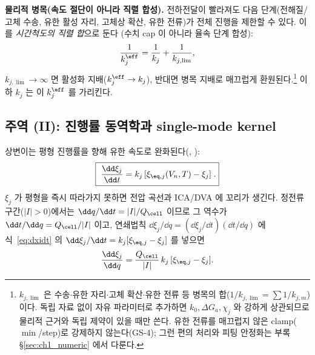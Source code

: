 \textbf{물리적 병목(속도 절단이 아니라 직렬 합성).} 전하전달이 빨라져도 다음 단계(전해질/고체 수송, 유한
활성 자리, 고체상 확산, 유한 전류)가 전체 진행을 제한할 수 있다. 이를 \emph{시간척도의 직렬 합}으로 둔다
(수치 cap 이 아니라 율속 단계 합성):
\begin{equation}
\frac{1}{k_j^{\eff}}=\frac{1}{k_j}+\frac{1}{k_{j,\lim}},
\label{eq:kphys}
\end{equation}
$k_{j,\lim}\to\infty$ 면 활성화 지배($k_j^{\eff}\to k_j$), 반대면 병목 지배로 매끄럽게 환원된다.\footnote{%
$k_{j,\lim}$ 은 수송$\cdot$유한 자리$\cdot$고체 확산$\cdot$유한 전류 등 병목의 합($1/k_{j,\lim}=\sum 1/k_{j,m}$)
이다. 독립 자료 없이 자유 파라미터로 추가하면 $k_0,\Delta G_a,\chi_j$ 와 강하게 상관되므로 물리적 근거와
독립 제약이 있을 때만 쓴다. 유한 전류를 매끄럽지 않은 clamp($\min$/step)로 강제하지 않는다(GS-4); 그런
편의 처리와 피팅 안정화는 부록 \S\ref{sec:ch1_numeric} 에서 다룬다.} 이하 $k_j$ 는 이 $k_j^{\eff}$ 를 가리킨다.

\subsection{주역 (II): 진행률 동역학과 single-mode kernel}\label{sec:dyn}
상변이는 평형 진행률을 향해 유한 속도로 완화된다(, \cite{onsager1931,degrootmazur1962}):
\begin{equation}
\boxed{\;\frac{\dd\xi_j}{\dd t}=k_j\,[\xi_{\eq,j}(V_n,T)-\xi_j]\;.}
\label{eq:dxidt}
\end{equation}
$\xi_j$ 가 평형을 즉시 따라가지 못하면 전압 곡선과 ICA/DVA 에 꼬리가 생긴다. 정전류 구간($|I|>0$)에서는
$\dd q/\dd t=|I|/Q_\cell$ 이므로 그 역수가 $\dd t/\dd q=Q_\cell/|I|$ 이고, 연쇄법칙
$\dd\xi_j/\dd q=(\dd\xi_j/\dd t)(\dd t/\dd q)$ 에 식~\eqref{eq:dxidt} 의 $\dd\xi_j/\dd t=k_j[\xi_{\eq,j}-\xi_j]$
를 넣으면
\begin{equation}
\frac{\dd\xi_j}{\dd q}=\frac{Q_\cell}{|I|}\,k_j\,[\xi_{\eq,j}-\xi_j].
\label{eq:dxidq}
\end{equation}

